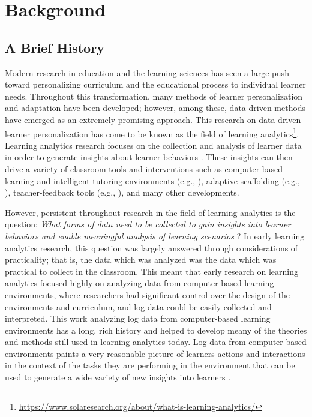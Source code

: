 \documentclass[manuscript,screen,review]{acmart}
\begin{document}
\section{Background} \label{sec:background}

\subsection{A Brief History}

Modern research in education and the learning sciences has seen a large push toward personalizing curriculum and the educational process to individual learner needs. Throughout this transformation, many methods of learner personalization and adaptation have been developed; however, among these, data-driven methods have emerged as an extremely promising approach. This research on data-driven learner personalization has come to be known as the field of learning analytics\footnote{\href{https://www.solaresearch.org/about/what-is-learning-analytics/}{https://www.solaresearch.org/about/what-is-learning-analytics/}}. Learning analytics research focuses on the collection and analysis of learner data in order to generate insights about learner behaviors \cite{maseleno2018demystifying, Zilvinskis2017}. These insights can then drive a variety of classroom tools and interventions such as computer-based learning and intelligent tutoring environments (e.g., \cite{heffernan2014assistments, leelawong2008designing}), adaptive scaffolding (e.g., \cite{Emerson2020, basu2017learner}), teacher-feedback tools (e.g., \cite{rodriguez2018teacher, Hutchins2023}), and many other developments. 

However, persistent throughout research in the field of learning analytics is the question: \textit{What forms of data need to be collected to gain insights into learner behaviors and enable meaningful analysis of learning scenarios} \cite{vatral2022using, ochoa2017multimodal}? In early learning analytics research, this question was largely answered through considerations of practicality; that is, the data which was analyzed was the data which was practical to collect in the classroom. This meant that early research on learning analytics focused highly on analyzing data from computer-based learning environments, where researchers had significant control over the design of the environments and curriculum, and log data could be easily collected and interpreted. This work analyzing log data from computer-based learning environments has a long, rich history and helped to develop meany of the theories and methods still used in learning analytics today. Log data from computer-based environments paints a very reasonable picture of learners actions and interactions in the context of the tasks they are performing in the environment that can be used to generate a wide variety of new insights into learners \cite{hoppe2017computational, ochoa2017multimodal}. 
\end{document}
